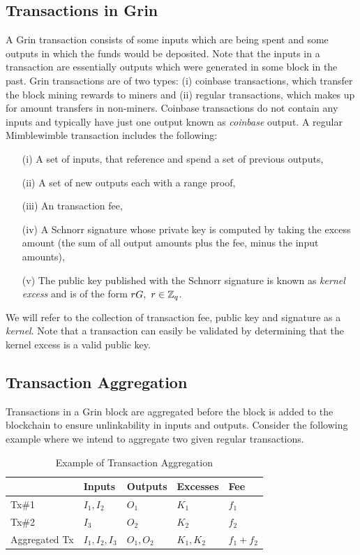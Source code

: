 \subsection{Transactions in Grin}
A Grin transaction consists of some inputs which are being spent and some outputs in which the funds would be deposited.
Note that the inputs in a transaction are essentially outputs which were generated in some block in the past.
Grin transactions are of two types: (i) coinbase transactions, which transfer the block mining rewards to miners and (ii) regular transactions, which makes up for amount transfers in non-miners.
Coinbase transactions do not contain any inputs and typically have just one output known as \textit{coinbase} output.
A regular Mimblewimble transaction \cite{GrinDocOnGithub} includes the following:
\begin{enumerate}
    \item[(i)] A set of inputs, that reference and spend a set of previous outputs,
    \item[(ii)] A set of new outputs each with a range proof,
    \item[(iii)] An transaction fee,
    \item[(iv)] A Schnorr signature whose private key is computed by taking the excess amount (the sum of all output amounts plus the fee, minus the input amounts),
    \item[(v)] The public key published with the Schnorr signature is known as \textit{kernel excess} and is of the form $rG, \ r \in \mathbb{Z}_q$.
\end{enumerate}
We will refer to the collection of transaction fee, public key and signature as a \textit{kernel}.
Note that a transaction can easily be validated by determining that the kernel excess is a valid public key. 

\subsection{Transaction Aggregation}
Transactions in a Grin block are aggregated before the block is added to the blockchain to ensure unlinkability in inputs and outputs.
Consider the following example where we intend to aggregate two given regular transactions.
\begin{table}[h!]
  \centering
    \begin{tabular}{ | m{3cm} | m{2cm}| m{2cm} | m{2cm} | m{2cm} |} 
    \hline
                           & Inputs & Outputs & Excesses & Fee \\
    \hline
    Tx\#1         & $I_1, I_2$ & $O_1$ & $K_1$  & $f_1$ \\ 
    \hline
    Tx\#2         & $I_3$ & $O_2$ & $K_2$  & $f_2$ \\ 
    \hline
    \hline
    Aggregated Tx & $I_1, I_2, I_3$ & $O_1, O_2$ & $K_1, K_2$  & $f_1 + f_2$\\ 
    \hline
    \end{tabular}
  \caption{Example of Transaction Aggregation}
  \label{table:tx_agg}
\end{table}

